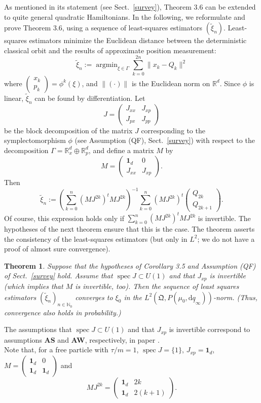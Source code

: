 \documentclass[11pt]{article}
\newtheorem{theorem}{Theorem}[section]
\begin{document}
As mentioned in its statement (see Sect.~\ref{survey}), Theorem 3.6 can be extended to quite general quadratic Hamiltonians. 
In the following, we reformulate and prove Theorem 3.6, using a sequence of least-squares estimators $(\tilde \xi_n)$. 
Least-squares estimators minimize the Euclidean distance between the deterministic classical orbit and 
the results of approximate position measurement:
$$\tilde\xi_n:=\operatorname{argmin}_{\xi\in \Gamma} \sum_{k=0}^{2n}\|x_k - Q_k\|^2$$
where $\begin{pmatrix} x_k\\ p_k\end{pmatrix}=\phi^k(\xi)$, and $\|(\cdot)\|$ is the Euclidean norm on 
$\mathbb R^d$. Since $\phi$ is linear, $\tilde\xi_n$ can be found by differentiation.
Let
    $$J=\begin{pmatrix}
        J_{xx} & J_{xp}\\ J_{px} & J_{pp}
    \end{pmatrix}$$
    be the block decomposition of the matrix $J$ corresponding to the symplectomorphism $\phi$ 
    (see Assumption (QF), Sect.~\ref{survey}) with respect to the decomposition 
    $\Gamma=\mathbb R_x^d\oplus \mathbb R_p^d$, 
    and define a matrix $M$ by
	$$M=\begin{pmatrix}
		\mathbf{1}_d &0\\
		J_{xx} & J_{xp}
	\end{pmatrix}.$$
Then
$$\tilde \xi_n:=\left(\sum_{k=0}^n(MJ^{2k})^tMJ^{2k}\right)^{-1}\sum_{k=0}^n (MJ^{2k})^t\begin{pmatrix}
	Q_{2k}\\ Q_{2k+1}
\end{pmatrix}.$$
Of course, this expression holds only if $\sum_{k=0}^n(MJ^{2k})^tMJ^{2k}$ is invertible. 
The hypotheses of the next theorem ensure that this is the case. The theorem asserts 
the consistency of the least-squares estimators (but only in $L^2$; we do not have a 
proof of almost sure convergence).
\begin{theorem}
    Suppose that the hypotheses of Corollary 3.5 and Assumption (QF) of Sect.~\ref{survey} hold. 
    Assume that $\operatorname{spec}J\subset U(1)$ and that $J_{xp}$ is invertible 
    (which implies that $M$ is invertible, too).
    Then the sequence of least squares estimators $(\tilde\xi_n)_{n\in \mathbb N_0}$ converges to $\xi_0$ in the 
    $L^2(\mathfrak{Q}, P(\mu_0,\text{d}\underline{q}_\infty))$-norm. (Thus, convergence also holds in probability.)
\end{theorem}
The assumptions that $\operatorname{spec}J\subset U(1)$ and that $J_{xp}$ is invertible correspond to assumptions {\bf AS} and {\bf AW}, respectively, in paper \cite{BBFF}.\\
Note that, for a free particle with $\tau/m=1$, $\operatorname{spec}J=\{1\}$, $J_{xp}=\mathbf{1}_d$, $M=\begin{pmatrix}
    \mathbf{1}_d & 0\\ \mathbf{1}_d &\mathbf{1}_d
\end{pmatrix}$ and
$$MJ^{2k}=\begin{pmatrix}
    \mathbf{1}_d & 2k\\ \mathbf{1}_d & 2(k+1)
\end{pmatrix}.$$
\end{document}
